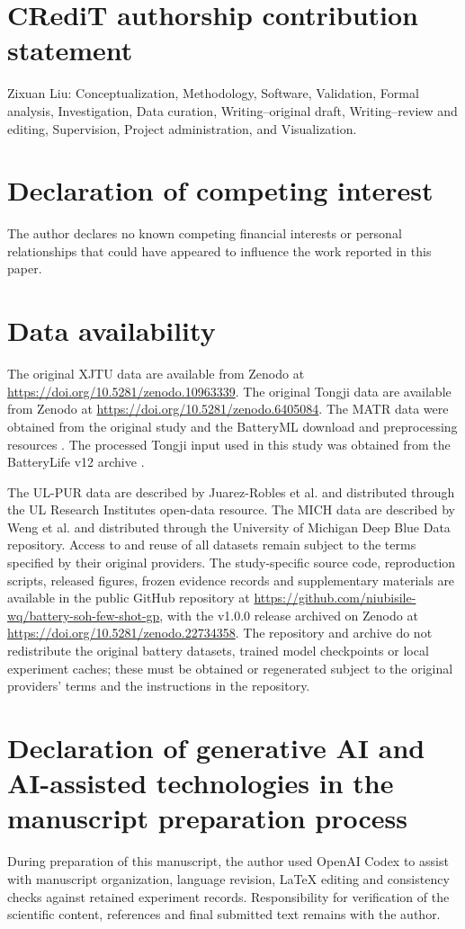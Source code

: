 \documentclass[preprint,12pt]{elsarticle}
\begin{document}
\section*{CRediT authorship contribution statement}
Zixuan Liu: Conceptualization, Methodology, Software, Validation, Formal analysis, Investigation, Data curation, Writing--original draft, Writing--review and editing, Supervision, Project administration, and Visualization.
\section*{Declaration of competing interest}
The author declares no known competing financial interests or personal relationships that could have appeared to influence the work reported in this paper.
\section*{Data availability}
The original XJTU data are available from Zenodo at \url{https://doi.org/10.5281/zenodo.10963339}. The original Tongji data are available from Zenodo at \url{https://doi.org/10.5281/zenodo.6405084}. The MATR data were obtained from the original study and the BatteryML download and preprocessing resources \citep{severson2019,batteryml2024}. The processed Tongji input used in this study was obtained from the BatteryLife v12 archive \citep{batterylife2025}.

The UL-PUR data are described by Juarez-Robles et al. \citep{ulpur2020} and distributed through the UL Research Institutes open-data resource. The MICH data are described by Weng et al. \citep{mich2021} and distributed through the University of Michigan Deep Blue Data repository. Access to and reuse of all datasets remain subject to the terms specified by their original providers. The study-specific source code, reproduction scripts, released figures, frozen evidence records and supplementary materials are available in the public GitHub repository at \url{https://github.com/niubisile-wq/battery-soh-few-shot-gp}, with the v1.0.0 release archived on Zenodo at \url{https://doi.org/10.5281/zenodo.22734358}. The repository and archive do not redistribute the original battery datasets, trained model checkpoints or local experiment caches; these must be obtained or regenerated subject to the original providers' terms and the instructions in the repository.
\section*{Declaration of generative AI and AI-assisted technologies in the manuscript preparation process}
During preparation of this manuscript, the author used OpenAI Codex to assist with manuscript organization, language revision, LaTeX editing and consistency checks against retained experiment records. Responsibility for verification of the scientific content, references and final submitted text remains with the author.
\FloatBarrier

\end{document}
